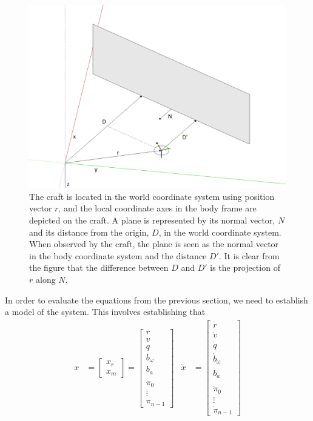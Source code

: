 \documentclass[]{article}
\begin{document}
{\begin{figure}[tb]
	\begin{center}
		\includegraphics[width=\textwidth]{coordinatesystem.png}
	\end{center}
	\caption{The craft is located in the world coordinate system using position vector $r$, and the local coordinate axes in the body frame are depicted on the craft. A plane is represented by its normal vector, $N$ and its distance from the origin, $D$, in the world coordinate system. When observed by the craft, the plane is seen as the normal vector in the body coordinate system and the distance $D'$. It is clear from the figure that the difference between $D$ and $D'$ is the projection of $r$ along $N$.}
	\label{fig:coordinatesystem}
\end{figure}

In order to evaluate the equations from the previous section, we need to establish a model of the system. This involves establishing that 
\begin{align}
	x &=
	\left[
	\begin{matrix}
		x_r \\
		x_m
	\end{matrix}
	\right]
	=
	\left[
	\begin{matrix}
		r \\
		v \\
		q \\
		b_\omega \\
		b_a \\
		\\
		\pi_0 \\
		\vdots \\
		\pi_{n-1}
	\end{matrix}
	\right]
	&
	\dot{x} &= 
	\left[
	\begin{matrix}
		\dot{r} \\
		\dot{v} \\
		\dot{q} \\
		\dot{b}_\omega \\
		\dot{b}_a \\
		\\
		\dot{\pi}_0 \\
		\vdots \\
		\dot{\pi}_{n-1}
	\end{matrix}
	\right]
\end{align}

}
\end{document}
